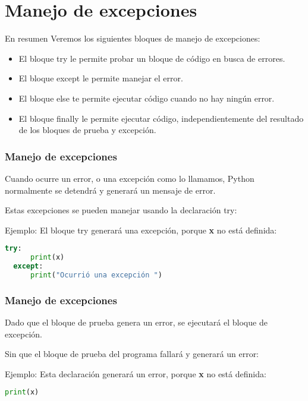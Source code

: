 
\section{Manejo de excepciones}

\begin{frame}[c]{En resumen}
  Veremos los siguientes bloques de manejo de excepciones:

  \vspace{\baselineskip}
  \begin{itemize}
    \item El bloque \textcolor{codeKeyword}{try} le permite probar un
      bloque de código en busca de errores.
    \pausa
    \item El bloque \textcolor{codeKeyword}{except} le permite manejar el
      error.
    \pausa
    \item El bloque \textcolor{codeKeyword}{else} te permite ejecutar
      código cuando no hay ningún error.
    \pausa
    \item El bloque \textcolor{codeKeyword}{finally} le permite ejecutar
      código, independientemente del resultado de los bloques de prueba y
      excepción.
  \end{itemize}
\end{frame}

\begin{frame}[fragile]
  \frametitle{Manejo de excepciones}
  Cuando ocurre un error, o una excepción como lo llamamos, Python
  normalmente se detendrá y generará un mensaje de error.

  \vspace{\baselineskip}
  Estas excepciones se pueden manejar usando la declaración
  \textcolor{codeKeyword}{try}:

  \vspace{\baselineskip}
  Ejemplo: El bloque \textcolor{codeKeyword}{try} generará una excepción,
  porque \textbf{x} no está definida:
  \begin{lstlisting}[language=Python]
  try:
      print(x)
  except:
      print("Ocurrió una excepción ")
  \end{lstlisting}
\end{frame}

\begin{frame}[fragile]
  \frametitle{Manejo de excepciones}
  Dado que el bloque de prueba genera un error, se ejecutará el
  bloque de excepción.

  \vspace{\baselineskip}
  Sin que el bloque de prueba del programa fallará y generará un error:

  \vspace{\baselineskip}
  Ejemplo: Esta declaración generará un error,
  porque \textbf{x} no está definida:
  \begin{lstlisting}[language=Python]
  print(x)
  \end{lstlisting}
\end{frame}

